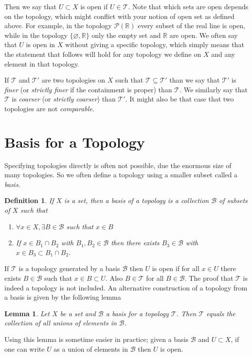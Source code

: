 \documentclass{article}
\newcommand{\Ba}{\mathcal{B}}
\newcommand{\Ta}{\mathcal{T}}
\newcommand{\R}{\mathbb{R}}
\newtheorem{lemma}[theorem]{Lemma}
\newtheorem*{definition}{Definition}
\theoremstyle{remark}
\begin{document}
Then we say that $U\subset X$ is open if $U\in\Ta$. 
Note that which sets are open depends on the topology, which might conflict with your notion of open set as defined above. 
For example, in the topology $\mathcal{P}(\R)$ every subset of the real line is open, while in the topology $\{\varnothing, \R\}$ only the empty set and $\R$ are open.
We often say that $U$ is open in $X$ without giving a specific topology, which simply means that the statement that follows will hold for any topology we define on $X$ and any element in that topology.

If $\Ta$ and $\Ta'$ are two topologies on $X$ such that $\Ta\subseteq\Ta'$ than we say that $\Ta'$ is \textit{finer} (or \textit{strictly finer} if the containment is proper) than $\Ta$. 
We similarly say that $\Ta$ is \textit{coarser} (or \textit{strictly coarser}) than $\Ta'$.
It might also be that case that two topologies are not \textit{comparable}.

\section{Basis for a Topology}
Specifying topologies directly is often not possible, due the enormous size of many topologies.
So we often define a topology using a smaller subset called a \textit{basis}.
\begin{definition}
    If $X$ is a set, then a \textit{basis} of a topology is a collection $\mathcal{B}$ of subsets of $X$ such that
    \begin{enumerate}
        \item $\forall x\in X, \exists B\in\mathcal{B}$ such that $x\in B$
        \item If $x\in B_1\cap B_2$ with $B_1,B_2\in\mathcal{B}$ then there exists $B_3\in\mathcal{B}$ with $x\in B_3\subset B_1\cap B_2$.
    \end{enumerate}
\end{definition}
If $\Ta$ is a topology generated by a basis $\Ba$ then $U$ is open if for all $x\in U$ there exists $B\in\Ba$ such that $x\in B\subset U$. 
Also $B\in\Ta$ for all $B\in\Ba$. The proof that $\Ta$ is indeed a topology is not included.
An alternative construction of a topology from a basis is given by the following lemma
\begin{lemma}
    Let $X$ be a set and $\Ba$ a basis for a topology $\Ta$. Then $\Ta$ equals the collection of all unions of elements in $\Ba$.
\end{lemma}
Using this lemma is sometime easier in practice; given a basis $\Ba$ and $U\subset X$, if one can write $U$ as a union of elements in $\Ba$ then $U$ is open.
\end{document}
